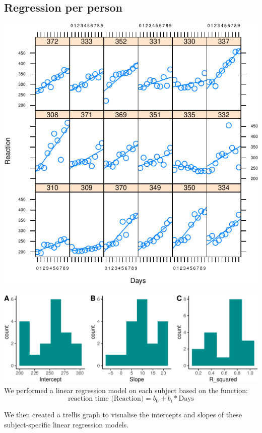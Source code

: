 \documentclass[
]{article}
\begin{document}
\hypertarget{regression-per-person}{%
\subsection{Regression per person}\label{regression-per-person}}

\begin{center}\includegraphics{common_sleep_files/figure-latex/trellis-1} \end{center}

\includegraphics{common_sleep_files/figure-latex/unnamed-chunk-3-1.pdf}
We performed a linear regression model on each subject based on the
function:
\[\text{reaction time (Reaction)} = b_0 + b_i* \text{Days} \tag{1}\]

We then created a trellis graph to visualise the intercepts and slopes
of these subject-specific linear regression models.
\end{document}
